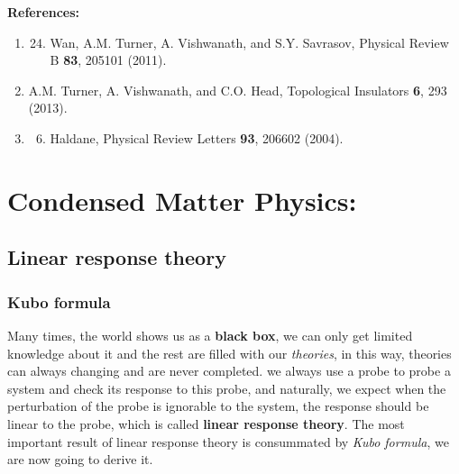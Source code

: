 \documentclass[letterpaper,10pt,english]{sphinxmanual}
\begin{document}
\textbf{References:}
\begin{enumerate}
\item {} \begin{enumerate}
\setcounter{enumi}{23}
\item {} 
Wan, A.M. Turner, A. Vishwanath, and S.Y. Savrasov, Physical Review B \textbf{83}, 205101 (2011).

\end{enumerate}

\item {} 
A.M. Turner, A. Vishwanath, and C.O. Head, Topological Insulators \textbf{6}, 293 (2013).

\item {} \begin{enumerate}
\setcounter{enumi}{5}
\item {} 
Haldane, Physical Review Letters \textbf{93}, 206602 (2004).

\end{enumerate}

\end{enumerate}


\chapter{Condensed Matter Physics:}
\label{index:condensed-matter-physics}

\section{Linear response theory}
\label{CMP/linear response theory/main:id1}\label{CMP/linear response theory/main::doc}\label{CMP/linear response theory/main:linear-response-theory}

\subsection{Kubo formula}
\label{CMP/linear response theory/Kubo_formula:kubo-formula}\label{CMP/linear response theory/Kubo_formula::doc}\label{CMP/linear response theory/Kubo_formula:id1}
Many times, the world shows us as a \textbf{black box}, we can only get limited knowledge about it and the rest are filled with our \emph{theories}, in this way, theories can always changing and are never completed. we always use a probe to probe a system and check its response to this probe, and naturally, we expect when the perturbation of the probe is ignorable to the system, the response should be linear to the probe, which is called \textbf{linear response theory}. The most important result of linear response theory is consummated by \emph{Kubo formula}, we are now going to derive it.
\end{document}
